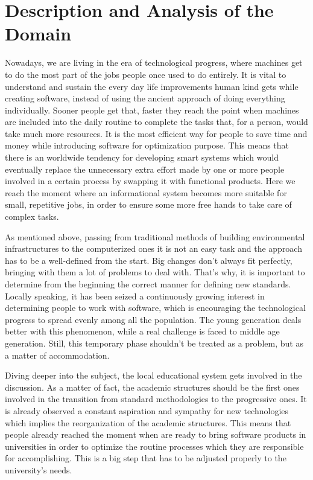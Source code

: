  \section{Description and Analysis of the Domain}

Nowadays, we are living in the era of technological progress, where machines get to do the most part of the jobs people once used to do entirely. It is vital to understand and sustain the every day life improvements human kind gets while creating software, instead of using the ancient approach of doing everything individually. Sooner people get that, faster they reach the point when machines are included into the daily routine to complete the tasks that, for a person, would take much more resources. It is the most efficient way for people to save time and money while introducing software for optimization purpose. This means that there is an worldwide tendency for developing smart systems which would eventually replace the unnecessary extra effort made by one or more people involved in a certain process by swapping it with functional products. Here we reach the moment where an informational system becomes more suitable for small, repetitive jobs, in order to ensure some more free hands to take care of complex tasks. 

As mentioned above, passing from traditional methods of building environmental infrastructures to the computerized ones it is not an easy task and the approach has to be a well-defined from the start. Big changes don't always fit perfectly, bringing with them a lot of problems to deal with. That's why, it is important to determine from the beginning the correct manner for defining new standards. Locally speaking, it has been seized a continuously growing interest in determining people to work with software, which is encouraging the technological progress to spread evenly among all the population. The young generation deals better with this phenomenon, while a real challenge is faced to middle age generation. Still, this temporary phase shouldn't be treated as a problem, but as a matter of accommodation.

Diving deeper into the subject, the local educational system gets involved in the discussion. As a matter of fact, the academic structures should be the first ones involved in the transition from standard methodologies to the progressive ones. It is already observed a constant aspiration and sympathy for new technologies which implies the reorganization of the academic structures. This means that people already reached the moment when are ready to bring software products in universities in order to optimize the routine processes which they are responsible for accomplishing.  This is a big step that has to be adjusted properly to the university's needs. 

